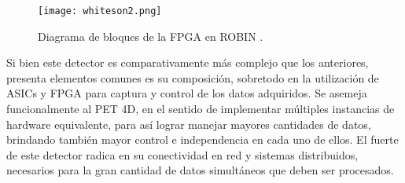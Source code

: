 	\begin{figure}[h]
		\centering
		\texttt{[image: whiteson2.png]}
		\caption{Diagrama de bloques de la FPGA en ROBIN \cite{Whiteson2016TheSystem}.}
		\label{fig:whiteson2}
	\end{figure}
	
	\newpage
	Si bien este detector es comparativamente más complejo que los anteriores, presenta elementos comunes es su composición, sobretodo en la utilización de ASICs y FPGA para captura y control de los datos adquiridos. Se asemeja funcionalmente al PET 4D, en el sentido de implementar múltiples instancias de hardware equivalente, para así lograr manejar mayores cantidades de datos, brindando también mayor control e independencia en cada uno de ellos. El fuerte de este detector radica en su conectividad en red y sistemas distribuidos, necesarios para la gran cantidad de datos simultáneos que deben ser procesados. 

%	
	
